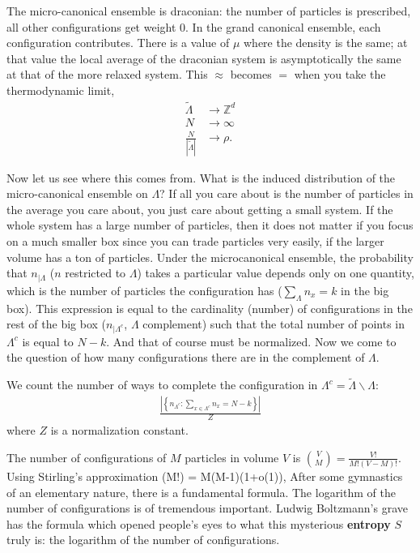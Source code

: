 \documentclass[12pt]{book}
\theoremstyle{norm}
\begin{document}
The micro-canonical ensemble is draconian: the number of particles is prescribed, all other configurations get weight 0. %
In the grand canonical ensemble, each configuration contributes. There is a value of $\mu$ where the density is the same; at that value the local average of the draconian system is asymptotically the same at that of the more relaxed system. This $\approx$ becomes $=$ when you take the thermodynamic limit,
\begin{align*}
\widetilde{\Lambda} & \to \mathbb{Z}^d\\
N & \to \infty\\
\frac{N}{|\widetilde{\Lambda}|} & \to \rho.
\end{align*}

Now let us see where this comes from. What is the induced distribution of the micro-canonical ensemble on $\Lambda$? If all you care about is the number of particles in the average you care about, you just care about getting a small system. If the whole system has a large number of particles, then it does not matter if you focus on a much smaller box since you can trade particles very easily, if the larger volume has a ton of particles. Under the microcanonical ensemble, the probability that $n_{|\Lambda}$ ($n$ restricted to $\Lambda$) takes a particular value depends only on one quantity, which is the number of particles the configuration has ($\sum_{\Lambda} n_x = k$ in the big box). This expression is equal to the cardinality (number) of configurations in the rest of the big box ($n_{|\Lambda^c}$, $\Lambda$ complement) such that the total number of points in $\Lambda^c$ is equal to $N - k$. And that of course must be normalized. Now we come to the question of how many configurations there are in the complement of $\Lambda$.

We count the number of ways to complete the configuration in $\Lambda^c=\widetilde{\Lambda}\backslash \Lambda$:
\begin{align*}
\frac{|\left\{{n_{\Lambda^c}}:{\sum_{x\in \Lambda^c}n_x=N-k}\right\}|}{Z}
\end{align*}
where $Z$ is a normalization constant.

The number of configurations of $M$ particles in volume $V$ is $\binom{V}{M} = \frac{V!}{M!(V-M)!}$. Using Stirling's approximation
\be
\ln (M!) = M(\ln M-1)(1+o(1)),
\ee
After some gymnastics of an elementary nature, there is a fundamental formula. The logarithm of the number of configurations is of tremendous important. Ludwig Boltzmann's grave has the formula which opened people's eyes to what this mysterious \textbf{entropy} $S$ truly is: the logarithm of the number of configurations. 
\end{document}
